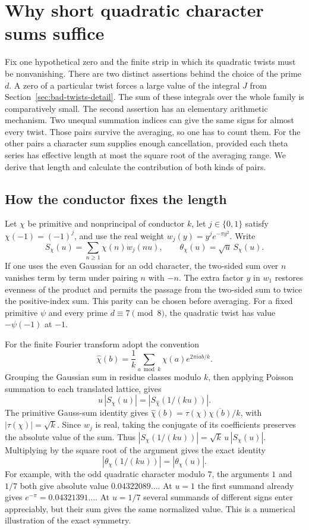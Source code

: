 \documentclass[11pt,letterpaper]{article}
\begin{document}
\section{Why short quadratic character sums suffice}\label{sec:twist-mean}

Fix one hypothetical zero and the finite strip in which its quadratic twists must be nonvanishing. There are two distinct assertions behind the choice of the prime \(d\). A zero of a particular twist forces a large value of the integral \(J\) from Section~\ref{sec:bad-twists-detail}. The sum of these integrals over the whole family is comparatively small. The second assertion has an elementary arithmetic mechanism. Two unequal summation indices can give the same signs for almost every twist. Those pairs survive the averaging, so one has to count them. For the other pairs a character sum supplies enough cancellation, provided each theta series has effective length at most the square root of the averaging range. We derive that length and calculate the contribution of both kinds of pairs.

\subsection{How the conductor fixes the length}

Let \(\chi\) be primitive and nonprincipal of conductor \(k\), let \(j\in\{0,1\}\) satisfy \(\chi(-1)=(-1)^j\), and use the real weight \(w_j(y)=y^j e^{-\pi y^2}\). Write
\[
   S_\chi(u)=\sum_{n\ge1}\chi(n)w_j(nu),\qquad
   \theta_\chi(u)=\sqrt u\,S_\chi(u).
\]
If one uses the even Gaussian for an odd character, the two-sided sum over \(n\) vanishes term by term under pairing \(n\) with \(-n\). The extra factor \(y\) in \(w_1\) restores evenness of the product and permits the passage from the two-sided sum to twice the positive-index sum. This parity can be chosen before averaging. For a fixed primitive \(\psi\) and every prime \(d\equiv7\pmod8\), the quadratic twist has value \(-\psi(-1)\) at \(-1\).

For the finite Fourier transform adopt the convention
\[
   \widehat\chi(b)=\frac1k\sum_{a\bmod k}\chi(a)e^{2\pi iab/k}.
\]
Grouping the Gaussian sum in residue classes modulo \(k\), then applying Poisson summation to each translated lattice, gives
\[
      u\,|S_\chi(u)|=|S_{\widehat\chi}(1/(ku))|.
\]
The primitive Gauss-sum identity gives \(\widehat\chi(b)=\tau(\chi)\overline{\chi(b)}/k\), with \(|\tau(\chi)|=\sqrt k\). Since \(w_j\) is real, taking the conjugate of its coefficients preserves the absolute value of the sum. Thus \(|S_\chi(1/(ku))|=\sqrt k\,u\,|S_\chi(u)|\). Multiplying by the square root of the argument gives the exact identity
\[
       |\theta_\chi(1/(ku))|=|\theta_\chi(u)|.
\]
For example, with the odd quadratic character modulo \(7\), the arguments \(1\) and \(1/7\) both give absolute value \(0.04322089\ldots\). At \(u=1\) the first summand already gives \(e^{-\pi}=0.04321391\ldots\). At \(u=1/7\) several summands of different signs enter appreciably, but their sum gives the same normalized value. This is a numerical illustration of the exact symmetry.
\end{document}
